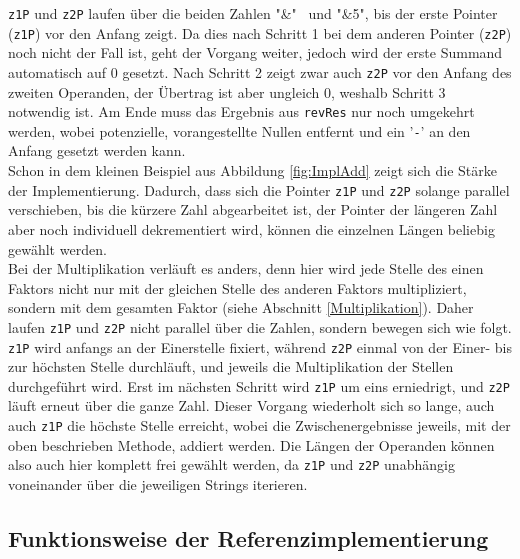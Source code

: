 \documentclass[course=erap]{aspdoc}
\begin{document}
    \verb+z1P+ und \verb+z2P+ laufen über die beiden Zahlen "\&" \ und "\&5", bis der erste Pointer (\verb+z1P+) vor den Anfang zeigt. Da
    dies nach Schritt 1 bei dem anderen Pointer (\verb+z2P+) noch nicht der Fall ist, geht der Vorgang weiter, jedoch wird der erste Summand
    automatisch auf 0 gesetzt. Nach Schritt 2 zeigt zwar auch \verb+z2P+ vor den Anfang des zweiten Operanden, der Übertrag ist aber ungleich
    0, weshalb Schritt 3 notwendig ist. Am Ende muss das Ergebnis aus \verb+revRes+ nur noch umgekehrt werden, wobei potenzielle,
    vorangestellte Nullen entfernt und ein '\verb+-+' an den Anfang gesetzt werden kann.\\
    \newline
    Schon in dem kleinen Beispiel aus Abbildung \ref{fig:ImplAdd} zeigt sich die Stärke der Implementierung. Dadurch, dass sich die Pointer
    \verb+z1P+ und \verb+z2P+ solange parallel verschieben, bis die kürzere Zahl abgearbeitet ist, der Pointer der längeren Zahl aber noch
    individuell dekrementiert wird, können die einzelnen Längen beliebig gewählt werden.\\
    \newline
    Bei der Multiplikation verläuft es anders, denn hier wird jede Stelle des einen Faktors nicht nur mit der gleichen Stelle des anderen
    Faktors multipliziert, sondern mit dem gesamten Faktor (siehe Abschnitt \ref{Multiplikation}). Daher laufen \verb+z1P+ und \verb+z2P+
    nicht parallel über die Zahlen, sondern bewegen sich wie folgt. \verb+z1P+ wird anfangs an der Einerstelle fixiert, während \verb+z2P+
    einmal von der Einer- bis zur höchsten Stelle durchläuft, und jeweils die Multiplikation der Stellen durchgeführt wird. Erst im nächsten
    Schritt wird \verb+z1P+ um eins erniedrigt, und \verb+z2P+ läuft erneut über die ganze Zahl. Dieser Vorgang wiederholt sich so lange, auch
    auch \verb+z1P+ die höchste Stelle erreicht, wobei die Zwischenergebnisse jeweils, mit der oben beschrieben Methode, addiert werden.
    Die Längen der Operanden können also auch hier komplett frei gewählt werden, da \verb+z1P+ und \verb+z2P+ unabhängig voneinander über
    die jeweiligen Strings iterieren.

    \subsection{Funktionsweise der Referenzimplementierung}\label{FunktRef}
\end{document}
